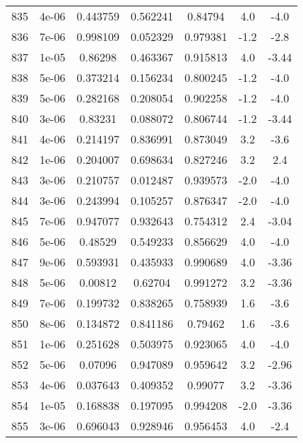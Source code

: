 \begin{table}
\begin{tabular}{c|c|c|c|c|c|c}
835 & 4e-06 & 0.443759 & 0.562241 & 0.84794 & 4.0 & -4.0\\
836 & 7e-06 & 0.998109 & 0.052329 & 0.979381 & -1.2 & -2.8\\
837 & 1e-05 & 0.86298 & 0.463367 & 0.915813 & 4.0 & -3.44\\
838 & 5e-06 & 0.373214 & 0.156234 & 0.800245 & -1.2 & -4.0\\
839 & 5e-06 & 0.282168 & 0.208054 & 0.902258 & -1.2 & -4.0\\
840 & 3e-06 & 0.83231 & 0.088072 & 0.806744 & -1.2 & -3.44\\
841 & 4e-06 & 0.214197 & 0.836991 & 0.873049 & 3.2 & -3.6\\
842 & 1e-06 & 0.204007 & 0.698634 & 0.827246 & 3.2 & 2.4\\
843 & 3e-06 & 0.210757 & 0.012487 & 0.939573 & -2.0 & -4.0\\
844 & 3e-06 & 0.243994 & 0.105257 & 0.876347 & -2.0 & -4.0\\
845 & 7e-06 & 0.947077 & 0.932643 & 0.754312 & 2.4 & -3.04\\
846 & 5e-06 & 0.48529 & 0.549233 & 0.856629 & 4.0 & -4.0\\
847 & 9e-06 & 0.593931 & 0.435933 & 0.990689 & 4.0 & -3.36\\
848 & 5e-06 & 0.00812 & 0.62704 & 0.991272 & 3.2 & -3.36\\
849 & 7e-06 & 0.199732 & 0.838265 & 0.758939 & 1.6 & -3.6\\
850 & 8e-06 & 0.134872 & 0.841186 & 0.79462 & 1.6 & -3.6\\
851 & 1e-06 & 0.251628 & 0.503975 & 0.923065 & 4.0 & -4.0\\
852 & 5e-06 & 0.07096 & 0.947089 & 0.959642 & 3.2 & -2.96\\
853 & 4e-06 & 0.037643 & 0.409352 & 0.99077 & 3.2 & -3.36\\
854 & 1e-05 & 0.168838 & 0.197095 & 0.994208 & -2.0 & -3.36\\
855 & 3e-06 & 0.696043 & 0.928946 & 0.956453 & 4.0 & -2.4\\
\end{tabular}
\end{table}
\newpage
